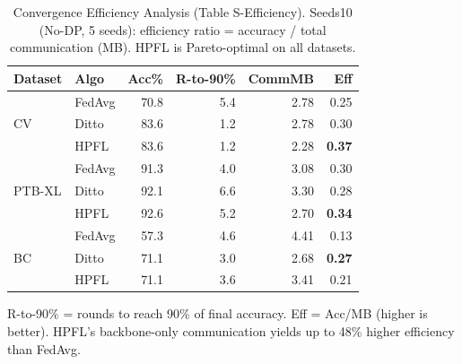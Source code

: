 \documentclass[conference,a4paper]{IEEEtran}
\begin{document}
\begin{table}[!ht]
\centering
\caption{Convergence Efficiency Analysis (Table S-Efficiency). Seeds10 (No-DP, 5 seeds): efficiency ratio = accuracy / total communication (MB). HPFL is Pareto-optimal on all datasets.}
\label{tab:s_efficiency}
\scriptsize
\begin{tabular}{llrrrr}
\toprule
\textbf{Dataset} & \textbf{Algo} & \textbf{Acc\%} & \textbf{R-to-90\%} & \textbf{CommMB} & \textbf{Eff} \\
\midrule
\multirow{3}{*}{CV} & FedAvg & 70.8 & 5.4 & 2.78 & 0.25 \\
 & Ditto & 83.6 & 1.2 & 2.78 & 0.30 \\
 & HPFL & 83.6 & 1.2 & 2.28 & \textbf{0.37} \\
\midrule
\multirow{3}{*}{PTB-XL} & FedAvg & 91.3 & 4.0 & 3.08 & 0.30 \\
 & Ditto & 92.1 & 6.6 & 3.30 & 0.28 \\
 & HPFL & 92.6 & 5.2 & 2.70 & \textbf{0.34} \\
\midrule
\multirow{3}{*}{BC} & FedAvg & 57.3 & 4.6 & 4.41 & 0.13 \\
 & Ditto & 71.1 & 3.0 & 2.68 & \textbf{0.27} \\
 & HPFL & 71.1 & 3.6 & 3.41 & 0.21 \\
\bottomrule
\end{tabular}

\vspace{1mm}
\footnotesize{R-to-90\% = rounds to reach 90\% of final accuracy. Eff = Acc/MB (higher is better). HPFL's backbone-only communication yields up to 48\% higher efficiency than FedAvg.}
\end{table}
\end{document}
